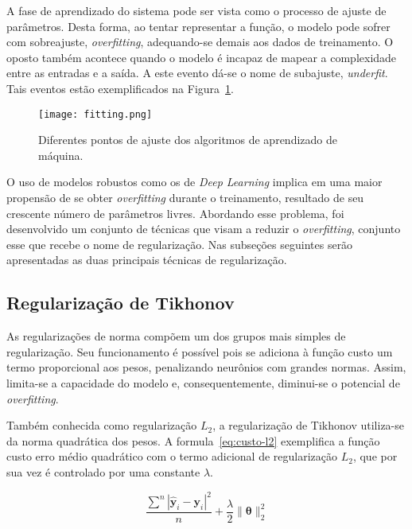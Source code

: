 A fase de aprendizado do sistema pode ser vista como o processo de ajuste de parâmetros.
Desta forma, ao tentar representar a função, o modelo pode sofrer com sobreajuste, \textit{overfitting}, adequando-se
demais aos dados de treinamento.
O oposto também acontece quando o modelo é incapaz de mapear a complexidade entre as entradas e a saída.
A este evento dá-se o nome de subajuste, \textit{underfit}.
Tais eventos estão exemplificados na Figura~\ref{fig:fitting}.


\begin{figure}
\begin{center} {
    \begin{center}
    \texttt{[image: fitting.png]}
    \caption{Diferentes pontos de ajuste dos algoritmos de aprendizado de máquina.}
    \label{fig:fitting}
    \end{center}
}
\end{center}
\end{figure}

O uso de modelos robustos como os de \textit{Deep Learning} implica em uma maior propensão de se obter
\textit{overfitting} durante o treinamento, resultado de seu crescente número de parâmetros livres.
Abordando esse problema, foi desenvolvido um conjunto de técnicas que visam a reduzir o \textit{overfitting}, conjunto
esse que recebe o nome de regularização.
Nas subseções seguintes serão apresentadas as duas principais técnicas de regularização.

\subsection{Regularização de Tikhonov}

As regularizações de norma compõem um dos grupos mais simples de regularização.
Seu funcionamento é possível pois se adiciona à função custo um termo proporcional aos pesos, penalizando neurônios
com grandes normas.
Assim, limita-se a capacidade do modelo e, consequentemente, diminui-se o potencial de \textit{overfitting}.

Também conhecida como regularização $L_{2}$, a regularização de Tikhonov utiliza-se da norma quadrática dos pesos.
A formula~\ref{eq:custo-l2} exemplifica a função custo erro médio quadrático com o termo adicional de regularização
$L_{2}$, que por sua vez é controlado por uma constante $\lambda$.

\begin{equation} \label{eq:custo-l2}
    \frac{\displaystyle\sum^n |\hat{\mathbf{y}}_i - \mathbf{y}_i|^2}{n} + \frac{\lambda}{2} \lVert \boldsymbol{\theta} \rVert_{2}^{2}
\end{equation}

